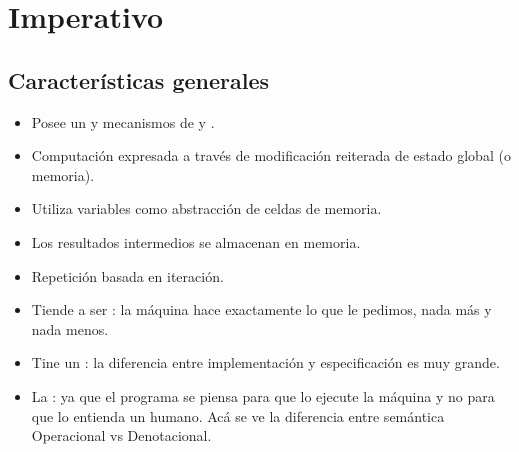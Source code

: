 \section{Imperativo}

\subsection{Características generales}

\begin{itemize}
  \item Posee un  y mecanismos de  y .
  \item Computación expresada a través de modificación reiterada de estado global (o memoria).
  \item Utiliza variables como abstracción de celdas de memoria.
  \item Los resultados intermedios se almacenan en memoria.
  \item Repetición basada en iteración.
  \item Tiende a ser : la máquina hace exactamente lo que le pedimos, nada más y nada menos.
  \item Tine un : la diferencia entre implementación y especificación es muy grande.
  \item La : ya que el programa se piensa para que lo ejecute la máquina y no para que lo entienda un humano. Acá se ve la diferencia entre semántica Operacional vs Denotacional.
\end{itemize}
